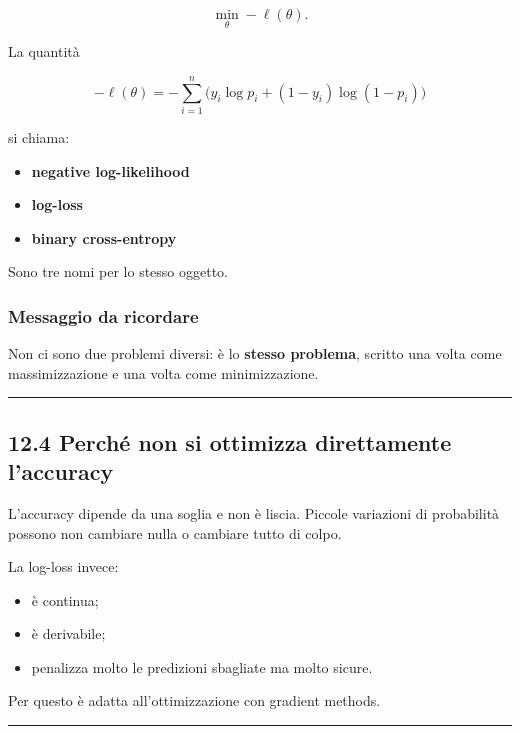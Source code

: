 \documentclass[
]{article}
\providecommand{\tightlist}{%
  \setlength{\itemsep}{0pt}\setlength{\parskip}{0pt}}
\begin{document}
\[
\min_\theta -\ell(\theta).
\]

La quantità

\[
-\ell(\theta)
=
-\sum_{i=1}^n \Big(y_i\log p_i + (1-y_i)\log(1-p_i)\Big)
\]

si chiama:

\begin{itemize}
\tightlist
\item
  \textbf{negative log-likelihood}
\item
  \textbf{log-loss}
\item
  \textbf{binary cross-entropy}
\end{itemize}

Sono tre nomi per lo stesso oggetto.

\subsubsection{Messaggio da ricordare}\label{messaggio-da-ricordare}

Non ci sono due problemi diversi: è lo \textbf{stesso problema}, scritto
una volta come massimizzazione e una volta come minimizzazione.

\begin{center}\rule{0.5\linewidth}{0.5pt}\end{center}

\subsection{12.4 Perché non si ottimizza direttamente
l'accuracy}\label{perchuxe9-non-si-ottimizza-direttamente-laccuracy}

L'accuracy dipende da una soglia e non è liscia. Piccole variazioni di
probabilità possono non cambiare nulla o cambiare tutto di colpo.

La log-loss invece:

\begin{itemize}
\tightlist
\item
  è continua;
\item
  è derivabile;
\item
  penalizza molto le predizioni sbagliate ma molto sicure.
\end{itemize}

Per questo è adatta all'ottimizzazione con gradient methods.

\begin{center}\rule{0.5\linewidth}{0.5pt}\end{center}
\end{document}
